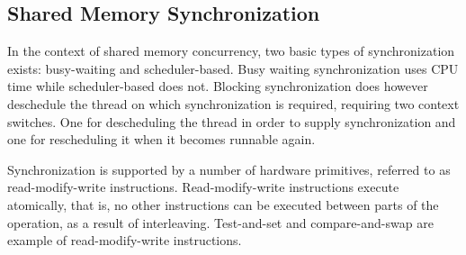 \subsection{Shared Memory Synchronization}
In the context of shared memory concurrency, two basic types of synchronization exists: busy-waiting and scheduler-based\cite[p. 1990]{scott2011sync}. Busy waiting synchronization uses \ac{CPU} time while scheduler-based does not. Blocking synchronization does however deschedule the thread on which synchronization is required, requiring two context switches. One for descheduling the thread in order to supply synchronization and one for rescheduling it when it becomes runnable again.

Synchronization is supported by a number of hardware primitives, referred to as read-modify-write instructions\cite[p. 1990]{scott2011sync}. Read-modify-write instructions execute atomically, that is, no other instructions can be executed between parts of the operation, as a result of interleaving. Test-and-set and compare-and-swap are example of read-modify-write instructions.  

\worksheetend
